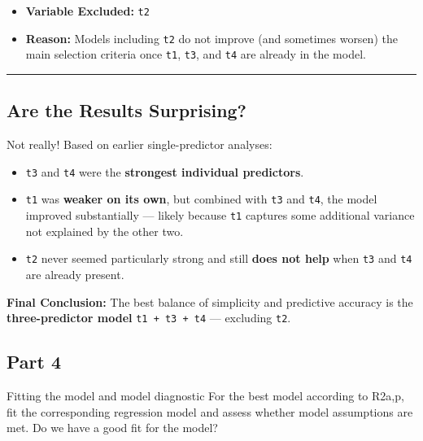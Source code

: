 \documentclass[
]{article}
\providecommand{\tightlist}{%
  \setlength{\itemsep}{0pt}\setlength{\parskip}{0pt}}
\begin{document}
\begin{itemize}
\tightlist
\item
  \textbf{Variable Excluded:} \texttt{t2}
\item
  \textbf{Reason:} Models including \texttt{t2} do not improve (and
  sometimes worsen) the main selection criteria once \texttt{t1},
  \texttt{t3}, and \texttt{t4} are already in the model.
\end{itemize}

\begin{center}\rule{0.5\linewidth}{0.5pt}\end{center}

\subsection{Are the Results
Surprising?}\label{are-the-results-surprising}

Not really! Based on earlier single-predictor analyses:

\begin{itemize}
\tightlist
\item
  \texttt{t3} and \texttt{t4} were the \textbf{strongest individual
  predictors}.
\item
  \texttt{t1} was \textbf{weaker on its own}, but combined with
  \texttt{t3} and \texttt{t4}, the model improved substantially ---
  likely because \texttt{t1} captures some additional variance not
  explained by the other two.
\item
  \texttt{t2} never seemed particularly strong and still \textbf{does
  not help} when \texttt{t3} and \texttt{t4} are already present.
\end{itemize}

\textbf{Final Conclusion:} The best balance of simplicity and predictive
accuracy is the \textbf{three-predictor model} \texttt{t1\ +\ t3\ +\ t4}
--- excluding \texttt{t2}.

\subsection{Part 4}\label{part-4}

Fitting the model and model diagnostic For the best model according to
R2a,p, fit the corresponding regression model and assess whether model
assumptions are met. Do we have a good fit for the model?
\end{document}
